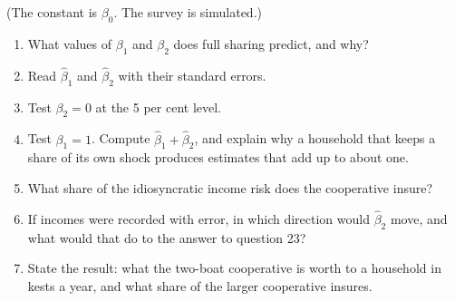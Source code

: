 \begin{problem}
\begin{center}
\end{center}
{\small (The constant is $\beta_0$. The survey is simulated.)}
\begin{enumerate}[resume]
  \item What values of $\beta_1$ and $\beta_2$ does full sharing predict, and why?
  \item Read $\hat\beta_1$ and $\hat\beta_2$ with their standard errors.
  \item Test $\beta_2 = 0$ at the 5 per cent level.
  \item Test $\beta_1 = 1$. Compute $\hat\beta_1 + \hat\beta_2$, and explain why a household that keeps a
        share of its own shock produces estimates that add up to about one.
  \item What share of the idiosyncratic income risk does the cooperative insure?
  \item If incomes were recorded with error, in which direction would $\hat\beta_2$ move, and what
        would that do to the answer to question 23?
  \item State the result: what the two-boat cooperative is worth to a household in kests a year, and
        what share of  the larger cooperative insures.
\end{enumerate}
\end{problem}

